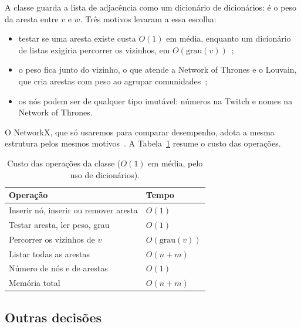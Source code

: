 A classe  guarda a lista de adjacência como um dicionário de dicionários:
 é o peso da aresta entre $v$ e $w$. Três motivos levaram a essa escolha:
\begin{itemize}
  \item testar se uma aresta existe custa $O(1)$ em média, enquanto um dicionário de listas
        exigiria percorrer os vizinhos, em $O(\text{grau}(v))$~\cite{pythoncomplexidade};
  \item o peso fica junto do vizinho, o que atende a Network of Thrones e o Louvain, que cria
        arestas com peso ao agrupar comunidades~\cite{blondel2008};
  \item os nós podem ser de qualquer tipo imutável: números na Twitch e nomes na Network of Thrones.
\end{itemize}
O NetworkX, que só usaremos para comparar desempenho, adota a mesma estrutura pelos mesmos
motivos~\cite{hagberg2008}. A Tabela~\ref{tab:complexidade} resume o custo das operações.

\begin{table}[htbp]
\centering
\caption{Custo das operações da classe  ($O(1)$ em média, pelo uso de dicionários).}
\label{tab:complexidade}
\small
\begin{tabular}{@{}l l@{}}
\toprule
Operação & Tempo \\
\midrule
Inserir nó, inserir ou remover aresta & $O(1)$ \\
Testar aresta, ler peso, grau & $O(1)$ \\
Percorrer os vizinhos de $v$ & $O(\text{grau}(v))$ \\
Listar todas as arestas & $O(n + m)$ \\
Número de nós e de arestas & $O(1)$ \\
Memória total & $O(n + m)$ \\
\bottomrule
\end{tabular}
\end{table}

\subsection{Outras decisões}

